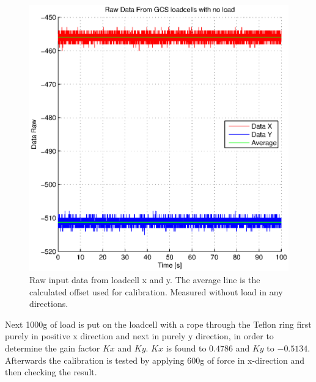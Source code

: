 \begin{figure}[H]
\centering
\includegraphics[scale=1]{graphics/gcs_test/calib_0_data_raw.eps}
\caption{Raw input data from loadcell x and y. The average line is the calculated offset used for calibration. Measured without load in any directions.}
\end{figure}

Next 1000g of load is put on the loadcell with a rope through the Teflon ring first purely in positive x direction and next in purely y direction, in order to determine the gain factor $Kx$ and $Ky$. $Kx$ is found to $0.4786$ and $Ky$ to $-0.5134$. Afterwards the calibration is tested by applying $600$g of force in x-direction and then checking the result.

